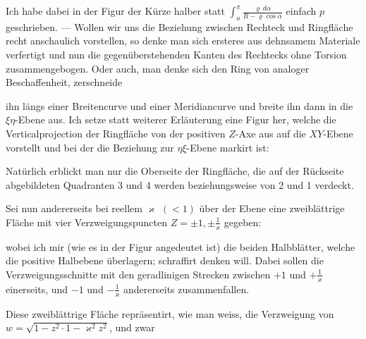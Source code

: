 \documentclass{article}
\begin{document}
Ich habe dabei in der Figur der Kürze halber statt $\displaystyle\int_{o}^{\pi} \frac{\varrho\,d\alpha}{R - \varrho \cos \alpha}$ einfach $p$ geschrieben. --- Wollen wir uns die Beziehung zwischen Rechteck und Ringfläche recht anschaulich vorstellen, so denke man sich ersteres aus dehnsamem Materiale verfertigt und nun die gegenüberstehenden Kanten des Rechtecks ohne Torsion zusammengebogen. Oder auch, man denke sich den Ring von analoger Beschaffenheit, zerschneide

ihn längs einer Breitencurve und einer Meridiancurve und breite ihn dann in die $\xi\eta$-Ebene aus. Ich setze statt weiterer Erläuterung eine Figur her, welche die Verticalprojection der Ringfläche von der positiven $Z$-Axe aus auf die $XY$-Ebene vorstellt und bei der die Beziehung zur $\eta\xi$-Ebene markirt ist:


Natürlich erblickt man nur die Oberseite der Ringfläche, die auf der Rückseite abgebildeten Quadranten 3 und 4 werden beziehungsweise von 2 und 1 verdeckt.

Sei nun andererseits bei reellem $\varkappa$ $(< 1)$ über der Ebene eine zweiblättrige Fläche mit vier Verzweigungspuncten $Z = \pm 1, \pm \frac{1}{\varkappa}$ gegeben:


wobei ich mir (wie es in der Figur angedeutet ist) die beiden Halbblätter, welche die positive Halbebene überlagern; schraffirt denken will. Dabei sollen die Verzweigungsschnitte mit den geradlinigen Strecken zwischen $+ 1$ und $+ \frac{1}{\varkappa}$ einerseits, und $- 1$ und $- \frac{1}{\varkappa}$ andererseits zusammenfallen.

Diese zweiblättrige Fläche repräsentirt, wie man weiss, die Verzweigung von $w = \sqrt{1 - z^{2} \cdot 1 - \varkappa^{2} z^{2}}$, und zwar
\end{document}
